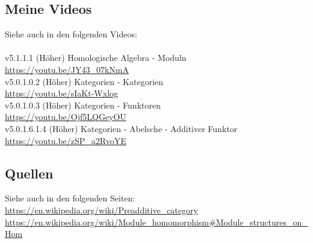 \documentclass[a4paper]{amsart}
\theoremstyle{definition}
\begin{document}
\subsection*{Meine Videos}
Siehe auch in den folgenden Videos:\\
\\
v5.1.1.1 (Höher) Homologische Algebra - Moduln\\
\url{https://youtu.be/JY43_07kNmA}
\\
v5.0.1.0.2 (Höher) Kategorien - Kategorien\\
\url{https://youtu.be/sIaKt-Wxlog}
\\
v5.0.1.0.3 (Höher) Kategorien - Funktoren\\
\url{https://youtu.be/Ojf5LQGeyOU}
\\
v5.0.1.6.1.4 (Höher) Kategorien - Abelsche - Additiver Funktor\\
\url{https://youtu.be/zSP_a2RvoYE}

\subsection*{Quellen}
Siehe auch in den folgenden Seiten:\\
\url{https://en.wikipedia.org/wiki/Preadditive_category}\\
\url{https://en.wikipedia.org/wiki/Module_homomorphism#Module_structures_on_Hom}

\end{document}

